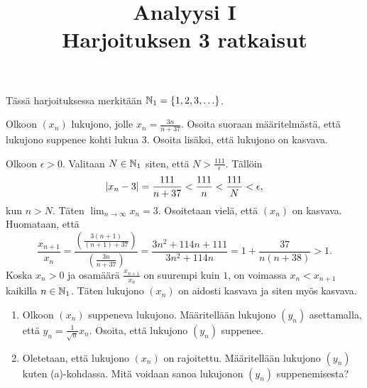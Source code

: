 \documentclass[11pt,a4paper]{amsart}
\title{Analyysi I\\Harjoituksen 3 ratkaisut}
\author{}
\date{}
\begin{document}

Tässä harjoituksessa merkitään \(\mathbb{N}_1 = \{1,2,3,\ldots\}\).

\begin{exercise}
  Olkoon \((x_n)\) lukujono, jolle \(x_n = \frac{3n}{n + 37}\). Osoita suoraan
  määritelmästä, että lukujono suppenee kohti lukua \(3\). Osoita lisäksi,
  että lukujono on kasvava.
\end{exercise}

\begin{solution}
  Olkoon \(\epsilon > 0\). Valitaan \(N \in \mathbb{N}_1\) siten, että \(N >
  \frac{111}{\epsilon}\). Tällöin
  \[
    \lvert x_n - 3\rvert = \frac{111}{n + 37} < \frac{111}{n} < \frac{111}{N}
    < \epsilon,
  \]
  kun \(n > N\). Täten \(\lim_{n \to \infty} x_n = 3\). Osoitetaan vielä,
  että \((x_n)\) on kasvava. Huomataan, että
  \[
    \frac{x_{n + 1}}{x_n} = \frac{\left(\frac{3(n + 1)}{(n + 1) +
    37}\right)}{\left(\frac{3n}{n + 37}\right)} = \frac{3n^2 + 114n +
    111}{3n^2 + 114n} = 1 + \frac{37}{n(n + 38)} > 1.
  \]
  Koska \(x_n > 0\) ja osamäärä \(\frac{x_{n + 1}}{x_n}\) on suurempi
  kuin \(1\),
  on voimassa \(x_n < x_{n + 1}\) kaikilla \(n \in \mathbb{N}_1\). Täten
  lukujono \((x_n)\) on aidosti kasvava ja siten myös kasvava.
\end{solution}

\begin{exercise}
  \leavevmode\par
\begin{enumerate}[label=\alph*), nosep]
  \item Olkoon \((x_n)\) suppeneva lukujono. Määritellään lukujono \((y_n)\)
    asettamalla, että \(y_n = \frac{1}{\sqrt{n}}x_n\). Osoita, että lukujono
    \((y_n)\) suppenee.
  \item Oletetaan, että lukujono \((x_n)\) on rajoitettu. Määritellään lukujono
    \((y_n)\) kuten (a)-kohdassa. Mitä voidaan sanoa lukujonon \((y_n)\)
    suppenemisesta?
\end{enumerate}
\end{exercise}
\end{document}
